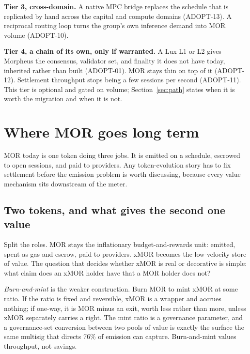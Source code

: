 \documentclass[11pt,a4paper]{article}
\begin{document}
\textbf{Tier 3, cross-domain.} A native MPC bridge replaces the schedule that is replicated by
hand across the capital and compute domains (ADOPT-13). A reciprocal routing loop turns the
group's own inference demand into MOR volume (ADOPT-10).

\textbf{Tier 4, a chain of its own, only if warranted.} A Lux L1 or L2 gives Morpheus the
consensus, validator set, and finality it does not have today, inherited rather than built
(ADOPT-01). MOR stays thin on top of it (ADOPT-12). Settlement throughput stops being a few
sessions per second (ADOPT-11). This tier is optional and gated on volume; Section~\ref{sec:path}
states when it is worth the migration and when it is not.

\section{Where MOR goes long term}
\label{sec:mor}

MOR today is one token doing three jobs. It is emitted on a schedule, escrowed to open
sessions, and paid to providers. Any token-evolution story has to fix settlement before the
emission problem is worth discussing, because every value mechanism sits downstream of the
meter.

\subsection{Two tokens, and what gives the second one value}

Split the roles. MOR stays the inflationary budget-and-rewards unit: emitted, spent as gas and
escrow, paid to providers. xMOR becomes the low-velocity store of value. The question that
decides whether xMOR is real or decorative is simple: what claim does an xMOR holder have that
a MOR holder does not?

\textit{Burn-and-mint} is the weaker construction. Burn MOR to mint xMOR at some ratio. If the
ratio is fixed and reversible, xMOR is a wrapper and accrues nothing; if one-way, it is MOR
minus an exit, worth less rather than more, unless xMOR separately carries a right. The mint
ratio is a governance parameter, and a governance-set conversion between two pools of value is
exactly the surface the same multisig that directs 76\% of emission can capture. Burn-and-mint
values throughput, not savings.
\end{document}
